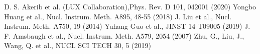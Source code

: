 \documentclass[a4paper,10pt,twoside]{cpc-hepnp}
\begin{document}
\begin{CJK*}{GB}{gbsn}
\begin{multicols}{2}
\begin{thebibliography}{90}
D. S. Akerib et al. (LUX Collaboration),Phys. Rev. D 101, 042001 (2020)
Yongbo Huang et al., Nucl. Instrum. Meth. A895, 48-55 (2018)
 J. Liu et al., Nucl. Instrum. Meth. A750, 19 (2014)
Yuhang Guo et al., JINST 14 T09005 (2019)
 J. F. Amsbaugh et al., Nucl. Instrum. Meth. A579, 2054 (2007)
Zhu, G., Liu, J., Wang, Q. et al., NUCL SCI TECH 30, 5 (2019)
\end{thebibliography}
\end{multicols}
\clearpage

\end{CJK*}
\end{document}
